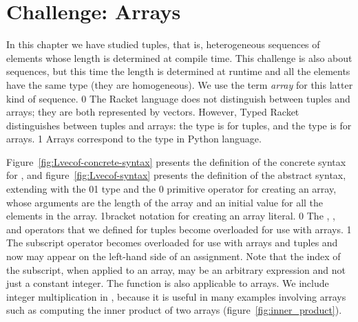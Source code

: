 \documentclass[7x10]{TimesAPriori_MIT}%
\def\racketEd{0}
\def\pythonEd{1}
\def\edition{0}
\newcommand{\racket}[1]{{\if\edition\racketEd{#1}\fi}}
\newcommand{\python}[1]{{\if\edition\pythonEd #1\fi}}
\numberwithin{theorem}{chapter}
\numberwithin{definition}{chapter}
\numberwithin{equation}{chapter}
\begin{document}
\section{Challenge: Arrays}
\label{sec:arrays}

In this chapter we have studied tuples, that is, heterogeneous
sequences of elements whose length is determined at compile time. This
challenge is also about sequences, but this time the length is
determined at runtime and all the elements have the same type (they
are homogeneous). We use the term \emph{array} for this latter kind of
sequence.
%
\racket{
The Racket language does not distinguish between tuples and arrays;
they are both represented by vectors. However, Typed Racket
distinguishes between tuples and arrays: the \code{Vector} type is for
tuples, and the \code{Vectorof} type is for arrays.}
\python{
Arrays correspond to the  type in Python language.
}

Figure~\ref{fig:Lvecof-concrete-syntax} presents the definition of the
concrete syntax for \LangArray{}, and figure~\ref{fig:Lvecof-syntax}
presents the definition of the abstract syntax, extending \LangVec{}
with the \racket{}\python{} type and the
%
\racket{ primitive operator for creating an array,
whose arguments are the length of the array and an initial value for
all the elements in the array.}
\python{bracket notation for creating an array literal.}
\racket{
The ,
, and \code{vector-ref!} operators that we defined
for tuples become overloaded for use with arrays.}
\python{
The subscript operator becomes overloaded for use with arrays and tuples
and now may appear on the left-hand side of an assignment.
Note that the index of the subscript, when applied to an array, may be an
arbitrary expression and not just a constant integer.
The \code{len} function is also applicable to arrays.
}
%
We include integer multiplication in \LangArray{}, because it is
useful in many examples involving arrays such as computing the
inner product of two arrays (figure~\ref{fig:inner_product}).

\newcommand{\LarrayGrammarRacket}{
\begin{array}{lcl}
  \Type &::=& \LP \key{Vectorof}~\Type \RP \\
  \Exp &::=& \CMUL{\Exp}{\Exp}
       \MID \CMAKEVEC{\Exp}{\Exp} 
\end{array}
}
\newcommand{\LarrayASTRacket}{
\begin{array}{lcl}
  \Type &::=& \LP \key{Vectorof}~\Type \RP \\
  \Exp &::=& \MUL{\Exp}{\Exp}
       \MID \MAKEVEC{\Exp}{\Exp} 
\end{array}
}
\end{document}
